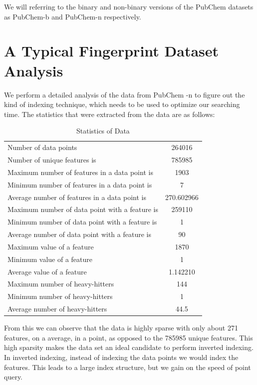 We will referring to the binary and non-binary versions of the PubChem datasets as PubChem-b and PubChem-n respectively.



\section{A Typical Fingerprint Dataset Analysis}
We perform a detailed analysis of the data from  PubChem -n to figure out the kind of indexing technique, which needs to be used to optimize our searching time. The statistics that were extracted from the data are as follows:\\

\begin{table}[ht!]
\centering
\caption{Statistics of Data}
\begin{tabular}{|l|c|}
\hline 
Number of data points & 264016 \\ 
Number of unique features is & 785985 \\ 
Maximum number of features in a data point is & 1903 \\ 
Minimum number of features in a data point is  & 7 \\ 
Average number of features in a data point is & 270.602966 \\ 
Maximum number of data point with a feature is & 259110 \\ 
Minimum number of data point with a feature is & 1 \\ 
Average number of data point with a feature is & 90
 \\ 
Maximum value of a feature  & 1870 \\ 
Minimum value of a feature
 & 1 \\ 
Average value of a feature & 1.142210 \\ 
Maximum number of heavy-hitters  & 144 \\ 
Minimum number of heavy-hitters  & 1 \\ 
 Average number of heavy-hitters  & 44.5 \\ 
\hline 
\end{tabular} 
\end{table}

From this we can observe that the data is highly sparse with only about 271 features, on a average, in a point, as opposed to the 785985 unique features. This high sparsity makes the data set an ideal candidate to perform inverted indexing. In inverted indexing, instead of indexing the data points we would index the features. This leads to a large index structure, but we gain on the speed of point query. \\

